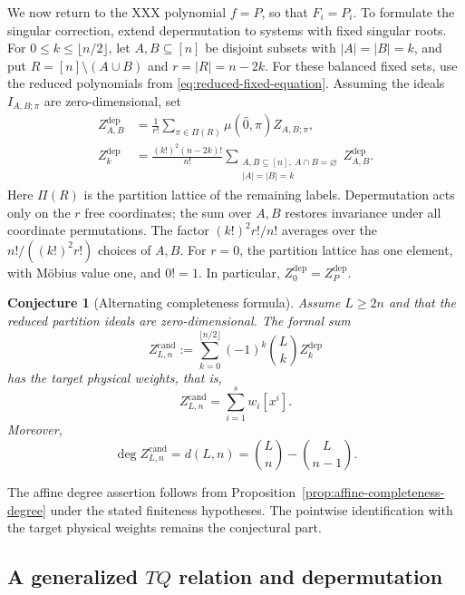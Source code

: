 \documentclass[11pt]{article}
\newtheorem{conjecture}[proposition]{Conjecture}
\theoremstyle{definition}
\begin{document}
We now return to the XXX polynomial $f=P$, so that $F_i=P_i$.
To formulate the singular correction, extend depermutation to systems
with fixed singular roots. For $0\le k\le\lfloor n/2\rfloor$,
let $A,B\subseteq[n]$ be disjoint subsets with $|A|=|B|=k$, and put
$R=[n]\setminus(A\cup B)$ and $r=|R|=n-2k$.
For these balanced fixed sets, use the reduced polynomials from
\eqref{eq:reduced-fixed-equation}. Assuming the ideals
$I_{A,B;\pi}$ are zero-dimensional, set
\begin{equation}\label{eq:reduced-fixed-pair-depermutation}
 \begin{aligned}
 Z^{\mathrm{dep}}_{A,B}
 &=\frac1{r!}\sum_{\pi\in\Pi(R)}
       \mu(\hat0,\pi)Z_{A,B;\pi},\\
 Z^{\mathrm{dep}}_k
 &=
 \frac{(k!)^2(n-2k)!}{n!}\sum_{\substack{A,B\subseteq[n],\ A\cap B=\varnothing\\
                   |A|=|B|=k}}Z^{\mathrm{dep}}_{A,B}.
 \end{aligned}
\end{equation}
Here $\Pi(R)$ is the partition lattice of the remaining labels.
Depermutation acts only on the $r$ free coordinates; the sum over $A,B$
restores invariance under all coordinate permutations. The factor
$(k!)^2r!/n!$ averages over the $n!/((k!)^2r!)$ choices of $A,B$.
For $r=0$, the partition lattice has one element, with M\"obius value
one, and $0!=1$. In particular, $Z^{\mathrm{dep}}_0=Z^{\mathrm{dep}}_P$.

\begin{conjecture}[Alternating completeness formula]
\label{conj:alternating-completeness}
Assume $L\ge2n$ and that the reduced partition ideals are
zero-dimensional. The formal sum
\begin{equation}\label{eq:central-alternating-cycle}
 \boxed{
 Z^{\mathrm{cand}}_{L,n}
 :=\sum_{k=0}^{\lfloor n/2\rfloor}(-1)^k\binom Lk
 Z^{\mathrm{dep}}_k
 }
\end{equation}
has the target physical weights, that is,
\[
 Z^{\mathrm{cand}}_{L,n}=\sum_{i=1}^s w_i[x^i].
\]
Moreover,
\[
 \deg Z^{\mathrm{cand}}_{L,n}
 =d(L,n)=\binom Ln-\binom L{n-1}.
\]
\end{conjecture}

The affine degree assertion follows from
Proposition~\ref{prop:affine-completeness-degree} under the stated
finiteness hypotheses. The pointwise identification with the target
physical weights remains the conjectural part.

\subsection{A generalized $TQ$ relation and depermutation}
\label{sec:general-tq}
\end{document}
